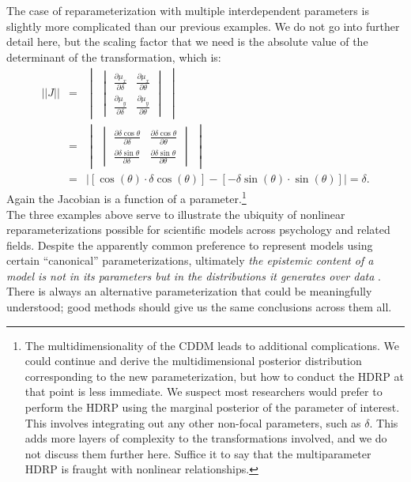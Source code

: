 \documentclass[9pt,twocolumn,twoside]{cidlab-draft}\templatetype{cidlab-invited}
\newcommand{\hdr}{HDRP}
\def\driftangle{\theta}
\def\driftlength{\delta}
\def\mux{\mu_x}
\def\muy{\mu_y}
\begin{document}
The case of reparameterization with multiple interdependent parameters is slightly more complicated than our previous examples.  We do not go into further detail here, but the scaling factor that we need is the absolute value of the determinant of the transformation, which is:
\begin{eqnarray*}
||J|| &=& \begin{vmatrix} \begin{vmatrix}
   \frac{\partial \mux}{\partial \driftlength}&\frac{\partial \mux}{\partial \driftangle}\\
   \frac{\partial \muy}{\partial \driftlength}&\frac{\partial \muy}{\partial \driftangle}
    \end{vmatrix} \end{vmatrix}\\ &=& \begin{vmatrix} \begin{vmatrix}
   \frac{\partial \driftlength \cos \driftangle}{\partial \driftlength}&\frac{\partial \driftlength \cos \driftangle}{\partial \driftangle}\\
   \frac{\partial \driftlength \sin \driftangle}{\partial \driftlength}&\frac{\partial \driftlength \sin \driftangle}{\partial \driftangle}
    \end{vmatrix} \end{vmatrix}\\ &=&
    \left|\left[\cos (\driftangle) \cdot \driftlength \cos (\driftangle) \right]-\left[- \driftlength \sin (\driftangle) \cdot \sin (\driftangle) \right]\right|=\driftlength.
\end{eqnarray*}
Again the Jacobian is a function of a parameter.\footnote{The multidimensionality of the CDDM leads to additional complications.  We could continue and derive the multidimensional posterior distribution corresponding to the new parameterization, but how to conduct the \hdr{} at that point is less immediate.  We suspect most researchers would prefer to perform the \hdr{} using the marginal posterior of the parameter of interest. This involves integrating out any other non-focal parameters, such as $\driftlength$. This adds more layers of complexity to the transformations involved, and we do not discuss them further here. Suffice it to say that the multiparameter \hdr{} is fraught with nonlinear relationships.}\\

\noindent The three examples above serve to illustrate the ubiquity of nonlinear reparameterizations possible for scientific models across psychology and related fields. Despite the apparently common preference to represent models using certain ``canonical'' parameterizations, ultimately \textit{the epistemic content of a model is not in its parameters but in the distributions it generates over data} \cite{villarreal2023}. There is always an alternative parameterization that could be meaningfully understood; good methods should give us the same conclusions across them all.
\end{document}

